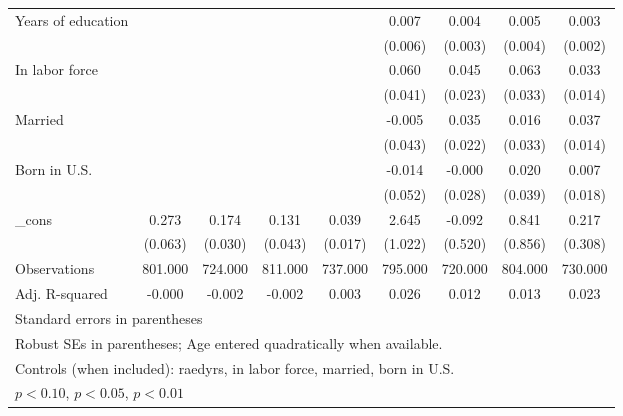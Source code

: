 \begin{table}[htbp]
\begin{tabular}{l*{8}{c}}
Years of education&                  &                  &                  &                  &    0.007         &    0.004         &    0.005         &    0.003         \\
          &                  &                  &                  &                  &  (0.006)         &  (0.003)         &  (0.004)         &  (0.002)         \\
In labor force&                  &                  &                  &                  &    0.060         &    0.045\sym{*}  &    0.063\sym{*}  &    0.033\sym{**} \\
          &                  &                  &                  &                  &  (0.041)         &  (0.023)         &  (0.033)         &  (0.014)         \\
Married   &                  &                  &                  &                  &   -0.005         &    0.035         &    0.016         &    0.037\sym{***}\\
          &                  &                  &                  &                  &  (0.043)         &  (0.022)         &  (0.033)         &  (0.014)         \\
Born in U.S.&                  &                  &                  &                  &   -0.014         &   -0.000         &    0.020         &    0.007         \\
          &                  &                  &                  &                  &  (0.052)         &  (0.028)         &  (0.039)         &  (0.018)         \\
\_cons    &    0.273\sym{***}&    0.174\sym{***}&    0.131\sym{***}&    0.039\sym{**} &    2.645\sym{***}&   -0.092         &    0.841         &    0.217         \\
          &  (0.063)         &  (0.030)         &  (0.043)         &  (0.017)         &  (1.022)         &  (0.520)         &  (0.856)         &  (0.308)         \\
\midrule
Observations&  801.000         &  724.000         &  811.000         &  737.000         &  795.000         &  720.000         &  804.000         &  730.000         \\
Adj. R-squared&   -0.000         &   -0.002         &   -0.002         &    0.003         &    0.026         &    0.012         &    0.013         &    0.023         \\
\bottomrule
\multicolumn{9}{l}{\footnotesize Standard errors in parentheses}\\
\multicolumn{9}{l}{\footnotesize Robust SEs in parentheses; Age entered quadratically when available.}\\
\multicolumn{9}{l}{\footnotesize Controls (when included): raedyrs, in labor force, married, born in U.S.}\\
\multicolumn{9}{l}{\footnotesize \sym{*} \(p<0.10\), \sym{**} \(p<0.05\), \sym{***} \(p<0.01\)}\\
\end{tabular}
\end{table}
